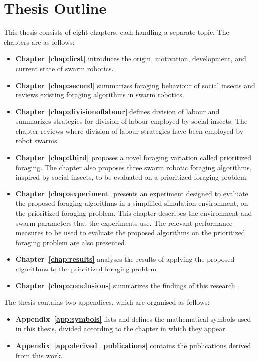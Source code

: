 \section{Thesis Outline}
\label{sec:introduction:outline}
This thesis consists of eight chapters, each handling a separate topic. The chapters are as follows:

\begin{itemize}
\item\textbf{Chapter~\ref{chap:first}} introduces the origin, motivation, development, and current state of swarm robotics.

\item\textbf{Chapter~\ref{chap:second}} summarizes foraging behaviour of social insects and reviews existing foraging algorithms in swarm robotics.

\item\textbf{Chapter~\ref{chap:divisionoflabour}} defines division of labour and summarizes strategies for division of labour employed by social insects. The chapter reviews where division of labour strategies have been employed by robot swarms.

\item\textbf{Chapter~\ref{chap:third}} proposes a novel foraging variation called prioritized foraging. The chapter also proposes three swarm robotic foraging algorithms, inspired by social insects, to be evaluated on a prioritized foraging problem.

\item\textbf{Chapter~\ref{chap:experiment}} presents an experiment designed to evaluate the proposed foraging algorithms in a simplified simulation environment, on the prioritized foraging problem. This chapter describes the environment and swarm parameters that the experiments use. The relevant performance measures to be used to evaluate the proposed algorithms on the prioritized foraging problem are also presented.

\item\textbf{Chapter~\ref{chap:results}} analyses the results of applying the proposed algorithms to the prioritized foraging problem.

\item\textbf{Chapter~\ref{chap:conclusions}} summarizes the findings of this research.

\end{itemize}

The thesis contains two appendices, which are organised as follows:

\begin{itemize}
	
\item\textbf{Appendix~\ref{app:symbols}} lists and defines the mathematical symbols used in this thesis, divided according to the chapter in which they appear.

\item\textbf{Appendix~\ref{app:derived_publications}} contains the publications derived from this work.

\end{itemize}




